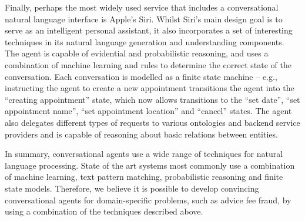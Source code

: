 Finally, perhaps the most widely used service that includes a conversational natural language interface is Apple's Siri. Whilst Siri's main design goal is to serve as an intelligent personal assistant, it also incorporates a set of interesting techniques in its natural language generation and understanding components. The agent is capable of evidential and probabilistic reasoning, and uses a combination of machine learning and rules to determine the correct state of the conversation. Each conversation is modelled as a finite state machine – e.g., instructing the agent to create a new appointment transitions the agent into the “creating appointment” state, which now allows transitions to the “set date”, “set appointment name”, “set appointment location” and “cancel” states. The agent also delegates different types of requests to various ontologies and backend service providers and is capable of reasoning about basic relations between entities.

In summary, conversational agents use a wide range of techniques for natural language processing. State of the art systems most commonly use a combination of machine learning, text pattern matching, probabilistic reasoning and finite state models. Therefore, we believe it is possible to develop convincing conversational agents for domain-specific problems, such as advice fee fraud, by using a combination of the techniques described above.